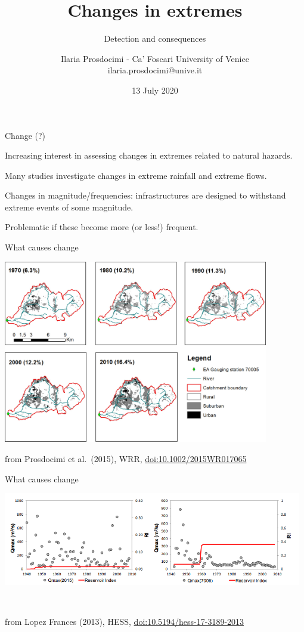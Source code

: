 \documentclass[
  10pt,
  ignorenonframetext,
  compress]{beamer}
\author{Ilaria Prosdocimi - Ca' Foscari University of Venice \\   ilaria.prosdocimi@unive.it}
\title{Changes in extremes}
\subtitle{Detection and consequences}
\date{13 July 2020}
\begin{document}
\frame{\titlepage}

\begin{frame}{Change (?)}
\protect\hypertarget{change}{}

Increasing interest in assessing changes in extremes related to natural
hazards.

Many studies investigate changes in extreme rainfall and extreme flows.

Changes in magnitude/frequencies: infrastructures are designed to
withstand extreme events of some magnitude.

Problematic if these become more (or less!) frequent.

\end{frame}

\begin{frame}{What causes change}
\protect\hypertarget{what-causes-change}{}

\begin{center}\includegraphics[width=0.87\textwidth]{wrcr21514-fig-0002-m} \end{center}

\footnotesize   from Prosdocimi et al.~(2015), WRR,
\url{doi:10.1002/2015WR017065}

\end{frame}

\begin{frame}{What causes change}
\protect\hypertarget{what-causes-change-1}{}

\begin{center}\includegraphics[width=0.98\textwidth]{ResIndex} \end{center}

~

\footnotesize   from Lopez Frances (2013), HESS,
\url{doi:10.5194/hess-17-3189-2013}

\end{frame}
\end{document}
